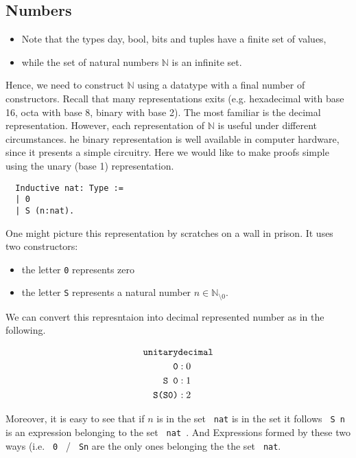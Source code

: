 \subsection{Numbers}
 \begin{itemize}
 \item[]Note that the types day, bool, bits and tuples have a finite set of values, 
 \item[] while the set of natural numbers $\mathbb{N}$ is an infinite set.
 \end{itemize}
  Hence, we need to construct $\mathbb{N}$ using a datatype with a final number of constructors. 
  Recall that many representations exits (e.g. hexadecimal with base 16, octa with base 8, binary with base 2).
  The most familiar is the decimal representation.
  However, each representation of $\mathbb{N}$ is useful under different circumstances. 
  he binary representation is well available in computer hardware, since it presents a simple circuitry.
  Here we would like to make proofs simple using the unary (base 1) representation.
  
  \begin{lstlisting}
  Inductive nat: Type :=
  | 0
  | S (n:nat).
  \end{lstlisting}
  
  One might picture this representation by scratches on a wall in prison. It uses two constructors: 
  \begin{itemize}
  \item the letter \lstinline!0! represents zero 
  \item the letter \lstinline!S! represents a natural number $n\in\mathbb{N}_{\setminus 0}$.  
  \end{itemize}
  We can convert this represntaion into decimal represented number as in the following.
  \begin{example}
  \begin{align*}
  \texttt{unitary}				& \texttt{decimal}	\\
  \texttt{\lstinline!0!} 		&: 0 				\\
  \texttt{\lstinline! S 0!}  	&: 1				\\
  \texttt{\lstinline! S(S0)!}	&: 2				\\
  \end{align*}
  \end{example}
  Moreover, it is easy to see that if $n$ is in the set \lstinline! nat! is in the set it follows \lstinline! S n ! is an expression belonging to the set \lstinline! nat !.
  And Expressions formed by these two ways (i.e. \lstinline! 0 ! / \lstinline! Sn! are the only ones belonging the the set \lstinline! nat!. 